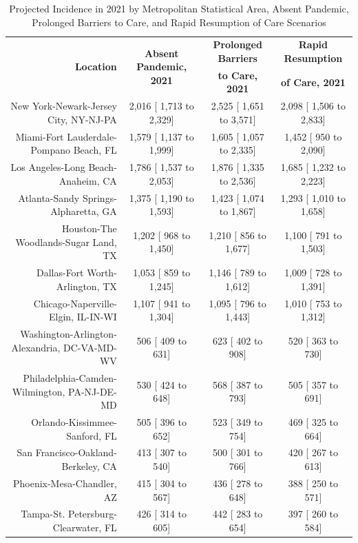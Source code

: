 \documentclass{article}
\begin{document}
\begin{table}[H]
	\caption{Projected Incidence in 2021 by Metropolitan Statistical Area, Absent Pandemic, Prolonged Barriers to Care, and Rapid Resumption of Care Scenarios}
	\footnotesize
	\begin{tabular}{|r|c|c|c|}
		\hline
		\multirow{2}{*}{\textbf{Location}} & \multirow{2}{*}{\textbf{Absent Pandemic, 2021}} & \textbf{Prolonged Barriers} & \textbf{Rapid Resumption}\\
		&  & \textbf{to Care, 2021} & \textbf{of Care, 2021}\\
		\hline\hline
		New York-Newark-Jersey City, NY-NJ-PA &  2,016 [ 1,713 to  2,329] &  2,525 [ 1,651 to  3,571] &  2,098 [ 1,506 to  2,833]\\
		Miami-Fort Lauderdale-Pompano Beach, FL &  1,579 [ 1,137 to  1,999] &  1,605 [ 1,057 to  2,335] &  1,452 [   950 to  2,090]\\
		Los Angeles-Long Beach-Anaheim, CA &  1,786 [ 1,537 to  2,053] &  1,876 [ 1,335 to  2,536] &  1,685 [ 1,232 to  2,223]\\
		Atlanta-Sandy Springs-Alpharetta, GA &  1,375 [ 1,190 to  1,593] &  1,423 [ 1,074 to  1,867] &  1,293 [ 1,010 to  1,658]\\
		Houston-The Woodlands-Sugar Land, TX &  1,202 [   968 to  1,450] &  1,210 [   856 to  1,677] &  1,100 [   791 to  1,503]\\
		Dallas-Fort Worth-Arlington, TX &  1,053 [   859 to  1,245] &  1,146 [   789 to  1,612] &  1,009 [   728 to  1,391]\\
		Chicago-Naperville-Elgin, IL-IN-WI &  1,107 [   941 to  1,304] &  1,095 [   796 to  1,443] &  1,010 [   753 to  1,312]\\
		Washington-Arlington-Alexandria, DC-VA-MD-WV &    506 [   409 to    631] &    623 [   402 to    908] &    520 [   363 to    730]\\
		Philadelphia-Camden-Wilmington, PA-NJ-DE-MD &    530 [   424 to    648] &    568 [   387 to    793] &    505 [   357 to    691]\\
		Orlando-Kissimmee-Sanford, FL &    505 [   396 to    652] &    523 [   349 to    754] &    469 [   325 to    664]\\
		San Francisco-Oakland-Berkeley, CA &    413 [   307 to    540] &    500 [   301 to    766] &    420 [   267 to    613]\\
		Phoenix-Mesa-Chandler, AZ &    415 [   304 to    567] &    436 [   278 to    648] &    388 [   250 to    571]\\
		Tampa-St. Petersburg-Clearwater, FL &    426 [   314 to    605] &    442 [   283 to    654] &    397 [   260 to    584]\\

\end{tabular}
\end{table}
\end{document}
